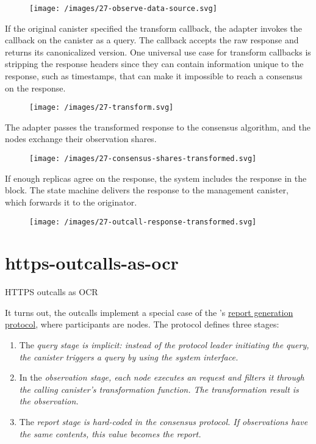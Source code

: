 \documentclass{article}
\begin{document}
\begin{figure}[grayscale-diagram,medium-size]
\texttt{[image: /images/27-observe-data-source.svg]}
\end{figure}

If the original canister specified the transform callback, the adapter invokes the callback on the canister as a query.
The callback accepts the raw  response and returns its canonicalized version.
One universal use case for transform callbacks is stripping the response headers since they can contain information unique to the response, such as timestamps, that can make it impossible to reach a consensus on the response.

\begin{figure}[grayscale-diagram,medium-size]
\texttt{[image: /images/27-transform.svg]}
\end{figure}

The adapter passes the transformed response to the consensus algorithm, and the nodes exchange their observation shares.

\begin{figure}[grayscale-diagram,medium-size]
\texttt{[image: /images/27-consensus-shares-transformed.svg]}
\end{figure}

If enough replicas agree on the response, the system includes the response in the block.
The state machine delivers the response to the management canister, which forwards it to the originator.

\begin{figure}[grayscale-diagram,medium-size]
\texttt{[image: /images/27-outcall-response-transformed.svg]}
\end{figure}

\section{https-outcalls-as-ocr}{HTTPS outcalls as OCR}

It turns out, the  outcalls implement a special case of the 's \href{/posts/24-ocr.html#report-generation}{report generation protocol}, where participants are  nodes.
The  protocol defines three stages:
\begin{enumerate}
    \item The \em{query} stage is implicit: instead of the protocol leader initiating the query, the canister triggers a query by using the system interface.
    \item In the \em{observation} stage, each node executes an  request and filters it through the calling canister's transformation function.
    The transformation result is the observation.
    \item The \em{report} stage is hard-coded in the  consensus protocol.
    If  observations have the same contents, this value becomes the report.
\end{enumerate}
\end{document}
